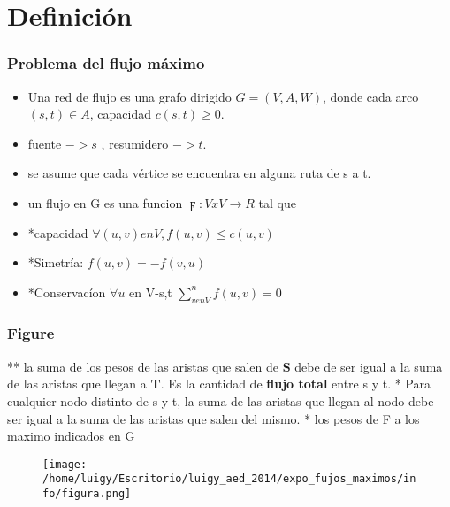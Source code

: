 \documentclass{beamer}
\begin{document}
\section{Definici\'on} %

      \begin{frame}
	\frametitle{Problema del flujo m\'aximo}
	\begin{itemize}
	    \item Una red de flujo es una grafo dirigido $G=(V,A,W)$, donde
		  cada arco $(s,t)\in A$, capacidad $c(s,t)\geq 0$.
	    \item fuente $-> s$ , resumidero $-> t$.
	    \item se asume que cada v\'ertice se encuentra en alguna ruta de s a t.
	    \item un flujo en G es una funcion $ \digamma : VxV \longrightarrow{} R $ tal que
	    \item *capacidad $ \forall{} (u,v) en V, f(u,v) \leq c(u,v)$
	    \item *Simetr\'ia: $f(u,v) = - f(v,u)$
	    \item *Conservac\'ion $ \forall{u}$ en V-{s,t}  $\sum_{v en V}^n{} f(u,v) = 0$
	 \end{itemize}
      \end{frame}

      
           
	\begin{frame}
	  \frametitle{Figure}
	  ** la suma de los pesos de las aristas que salen de \textbf{S} debe de ser igual
	     a la suma de las aristas que llegan a \textbf{T}. Es la cantidad de \textbf{flujo total} entre s y t.
	  *  Para cualquier nodo distinto de s y t, la suma de las aristas que llegan al nodo debe ser igual a la 
	     suma de las aristas que salen del mismo.
	  *  los pesos de F a los maximo indicados en G
	  \begin{figure}
	    \texttt{[image: /home/luigy/Escritorio/luigy\_aed\_2014/expo\_fujos\_maximos/info/figura.png]}
	  \end{figure}
	\end{frame}
\end{document}
